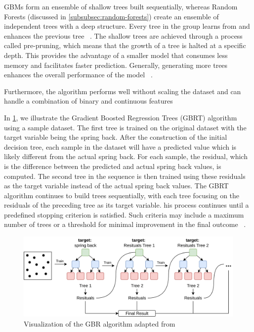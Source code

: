 GBMs form an ensemble of shallow trees built sequentially, whereas Random Forests (discussed in
\cref{subsubsec:random-forests}) create an ensemble of independent trees with a deep structure.
Every tree in the group learns from and enhances the previous tree
~\cite[p. 221]{boehmke2019hands}.
The shallow trees are achieved through a process called pre-pruning, which means that the growth of a tree is halted
at a specific depth.
This provides the advantage of a smaller model that consumes less memory and facilitates faster prediction.
Generally, generating more trees enhances the overall performance of the
model
~\cite[pp. 74, 88--89]{muller2016introduction}.

Furthermore, the algorithm performs well without scaling the dataset and can handle a combination of binary and
continuous features
~\cite[p. 91]{muller2016introduction}

In \cref{fig:gbr-example}, we illustrate the Gradient Boosted Regression Trees (GBRT) algorithm using a sample
dataset.
The first tree is trained on the original dataset with the target variable being the spring back.
After the construction of the initial decision tree, each sample in the dataset will have a predicted value which is
likely
different from the actual spring back.
For each sample, the residual, which is the difference between the predicted and actual spring back values, is
computed.
The second tree in the sequence is then trained using these residuals as the target variable instead of the
actual spring back values.
The GBRT algorithm continues to build trees sequentially, with each tree focusing on the residuals of the preceding
tree as its target variable.
his process continues until a predefined stopping criterion is satisfied.
Such criteria may include a maximum number of trees or a threshold for minimal improvement in the final
outcome
~\cite[p. 227]{boehmke2019hands}.

\begin{figure}[h]
    \begin{tcolorbox}[arc=0pt,boxrule=0.5pt]
        \centering
        \includegraphics[width=1\textwidth]{chap4/images/gradient_boosting_example}
    \end{tcolorbox}
    \caption{Visualization of the \ac{GBR} algorithm adapted from~\cite[p. 222]{boehmke2019hands}}
    \label{fig:gbr-example}
\end{figure}


